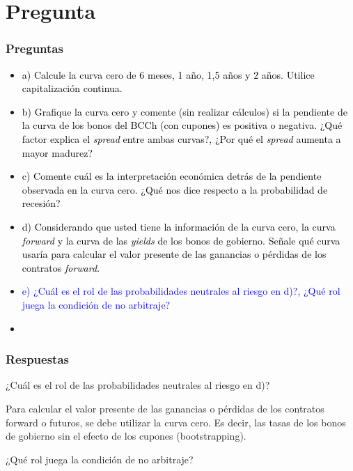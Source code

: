 \documentclass{beamer}
\newif\ifpresentacion
\newcommand{\pausa}{\ifpresentacion\pause\fi}
\begin{document}
\section{Pregunta }

\begin{frame}
  \frametitle{Preguntas}
  \begin{itemize}
    \scriptsize
    \item {\textcolor{black}{a) Calcule la curva cero de 6 meses, 1 año, 1,5 años y 2 años. Utilice capitalización continua.}}
    \vspace{3pt}
    \item {\textcolor{black}{b) Grafique la curva cero y comente (sin realizar cálculos) si la pendiente de la curva de los bonos del BCCh (con cupones) es positiva o negativa. ¿Qué factor explica el \textit{spread} entre ambas curvas?, ¿Por qué el \textit{spread} aumenta a mayor madurez?}}
    \vspace{3pt}
    \item {\textcolor{black}{c) Comente cuál es la interpretación económica detrás de la pendiente observada en la curva cero. ¿Qué nos dice respecto a la probabilidad de recesión?}}
    \vspace{3pt}
    \item {\textcolor{black}{d) Considerando que usted tiene la información de la curva cero, la curva \textit{forward} y la curva de las \textit{yields} de los bonos de gobierno. Señale qué curva usaría para calcular el valor presente de las ganancias o pérdidas de los contratos \textit{forward}.}}
    \vspace{3pt}
    \item {\Large\textcolor{blue}{e) ¿Cuál es el rol de las probabilidades neutrales al riesgo en d)?, ¿Qué rol juega la condición de no arbitraje?}}
    \vspace{3pt}
    \item {\textcolor{white}{f) Calcule el punto a) utilizando matrices en Excel/R/Python.}}
    \vspace{3pt}
  \end{itemize}
\end{frame}

\begin{frame}
  \frametitle{Respuestas }
  \begin{block}{¿Cuál es el rol de las probabilidades neutrales al riesgo en d)?}
    \pausa
    Para calcular el valor presente de las ganancias o pérdidas de los contratos forward o
    futuros, se debe utilizar la curva cero. Es decir, las tasas de los bonos de gobierno sin el
    efecto de los cupones (bootstrapping).
  \end{block}
  \begin{block}{¿Qué rol juega la condición de no arbitraje?}
    
  \end{block}
\end{frame}
\end{document}
